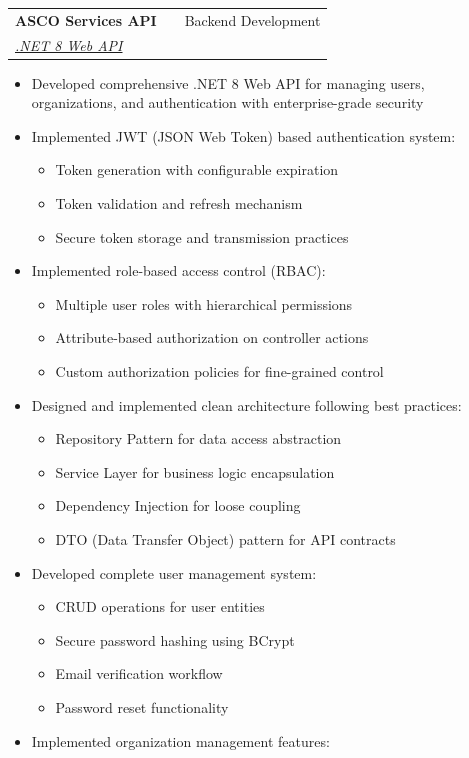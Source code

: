 \documentclass[a4paper,12pt]{article}
\makeatletter
\newenvironment{projectdetailed}[3]
    {
    \begin{tabularx}{\linewidth}{@{}l X r@{}}
    \textbf{#1} & \hfill & #2 \\
    \textit{#3} & & \\[3.75pt]
    \end{tabularx}
    \begin{minipage}[t]{\linewidth}
    \begin{itemize}[nosep,after=\strut, leftmargin=1em, itemsep=2pt,label=--]
    }
    {
    \end{itemize}
    \end{minipage}
    \vspace{6pt}
    }
\makeatother
\begin{document}
\begin{projectdetailed}{ASCO Services API}{Backend Development}{\href{https://github.com/}{.NET 8 Web API}}
\item Developed comprehensive .NET 8 Web API for managing users, organizations, and authentication with enterprise-grade security
\item Implemented JWT (JSON Web Token) based authentication system:
\begin{itemize}[nosep, leftmargin=2em]
    \item Token generation with configurable expiration
    \item Token validation and refresh mechanism
    \item Secure token storage and transmission practices
\end{itemize}
\item Implemented role-based access control (RBAC):
\begin{itemize}[nosep, leftmargin=2em]
    \item Multiple user roles with hierarchical permissions
    \item Attribute-based authorization on controller actions
    \item Custom authorization policies for fine-grained control
\end{itemize}
\item Designed and implemented clean architecture following best practices:
\begin{itemize}[nosep, leftmargin=2em]
    \item Repository Pattern for data access abstraction
    \item Service Layer for business logic encapsulation
    \item Dependency Injection for loose coupling
    \item DTO (Data Transfer Object) pattern for API contracts
\end{itemize}
\item Developed complete user management system:
\begin{itemize}[nosep, leftmargin=2em]
    \item CRUD operations for user entities
    \item Secure password hashing using BCrypt
    \item Email verification workflow
    \item Password reset functionality
\end{itemize}
\item Implemented organization management features:

\end{projectdetailed}
\end{document}
